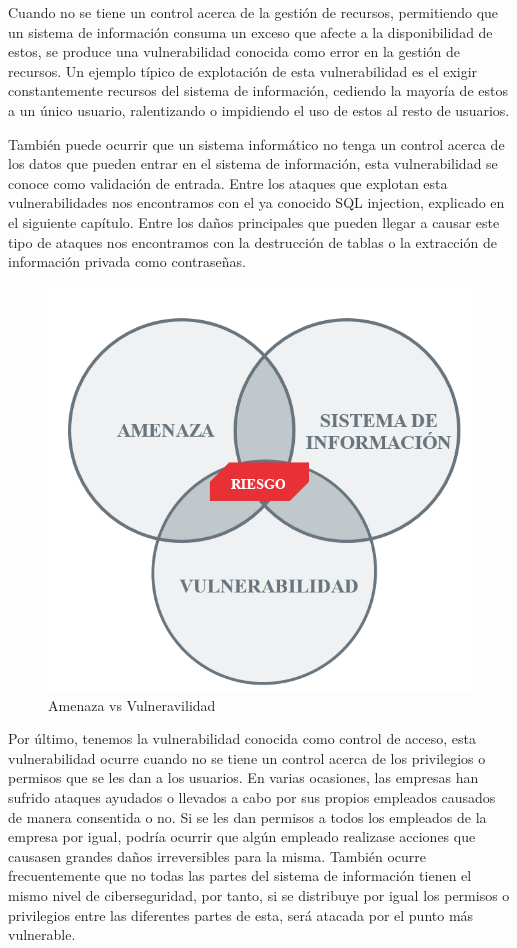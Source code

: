 Cuando no se tiene un control acerca de la gestión de recursos, permitiendo que un sistema de información consuma un exceso que afecte a la disponibilidad de estos, se produce una vulnerabilidad conocida como error en la gestión de recursos. Un ejemplo típico de explotación de esta vulnerabilidad es el exigir constantemente recursos del sistema de información, cediendo la mayoría de estos a un único usuario, ralentizando o impidiendo el uso de estos al resto de usuarios.

También puede ocurrir que un sistema informático no tenga un control acerca de los datos que pueden entrar en el sistema de información, esta vulnerabilidad se conoce como validación de entrada. Entre los ataques que explotan esta vulnerabilidades nos encontramos con el ya conocido SQL injection, explicado en el siguiente capítulo. Entre los daños principales que pueden llegar a causar este tipo de ataques nos encontramos con la destrucción de tablas o la extracción de información privada como contraseñas.

\begin{figure}[tphb]
  		   \centering
     		   \includegraphics[width=5in]{vulnerabilidades.png}
  		   \caption{Amenaza vs Vulneravilidad \cite{incibe2}}
  		   \label{img:vulnerabilidades}
\end{figure}

Por último, tenemos la vulnerabilidad conocida como control de acceso, esta vulnerabilidad ocurre cuando no se tiene un control acerca de los privilegios o permisos que se les dan a los usuarios.
En varias ocasiones, las empresas han sufrido ataques ayudados o llevados a cabo por sus propios empleados causados de manera consentida o no.
Si se les dan permisos a todos los empleados de la empresa por igual, podría ocurrir que algún empleado realizase acciones que causasen grandes daños irreversibles para la misma.
También ocurre frecuentemente que no todas las partes del sistema de información tienen el mismo nivel de ciberseguridad, por tanto, si se distribuye por igual los permisos o privilegios entre las diferentes partes de esta, será atacada por el punto más vulnerable.

